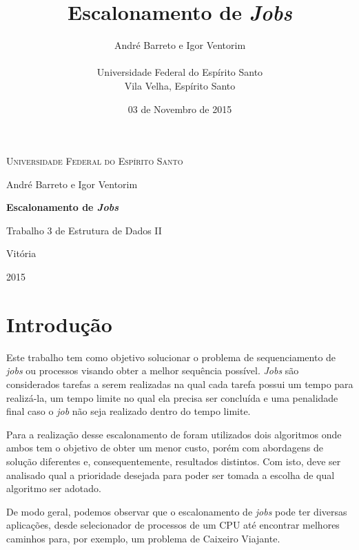 \documentclass[
	11pt,				%
	oneside,			%
	a4paper,			%
	english,			%
	brazil,				%
	]{article}
\title{\textbf{Escalonamento de \textit{Jobs}}}
\author{
André Barreto e Igor Ventorim\\\\
\normalsize Universidade Federal do Espírito Santo\\
\normalsize Vila Velha, Espírito Santo
}
\date{03 de Novembro de 2015}
\begin{document}

\frenchspacing

\begin{titlepage}
	\centering
	{\scshape \large Universidade Federal do Espírito Santo \par}
	\vspace{1cm}
	{\large André Barreto e Igor Ventorim\par}
	
	\vfill
	{\LARGE \bfseries Escalonamento de \textit{Jobs}\par}
	\vspace{1cm}
	{\large Trabalho 3 de Estrutura de Dados II\par}

	\vfill

	{\large Vitória\par}
	{\large 2015\par}
\end{titlepage}

\section{Introdução}
Este trabalho tem como objetivo solucionar o problema de sequenciamento de \textit{jobs} ou processos visando obter a melhor sequência possível. \textit{Jobs} são considerados tarefas a serem realizadas na qual cada tarefa possui um tempo para realizá-la, um tempo limite no qual ela precisa ser concluída e uma penalidade final caso o \textit{job} não seja realizado dentro do tempo limite.

Para a realização desse escalonamento de foram utilizados dois algoritmos onde ambos tem o objetivo de obter um menor custo, porém com abordagens de solução diferentes e, consequentemente, resultados distintos. Com isto, deve ser analisado qual a prioridade desejada para poder ser tomada a escolha de qual algoritmo ser adotado.

De modo geral, podemos observar que o escalonamento de \textit{jobs} pode ter diversas aplicações, desde selecionador de processos de um CPU \cite{jobs} até encontrar melhores caminhos para, por exemplo, um problema de Caixeiro Viajante.

\end{document}
